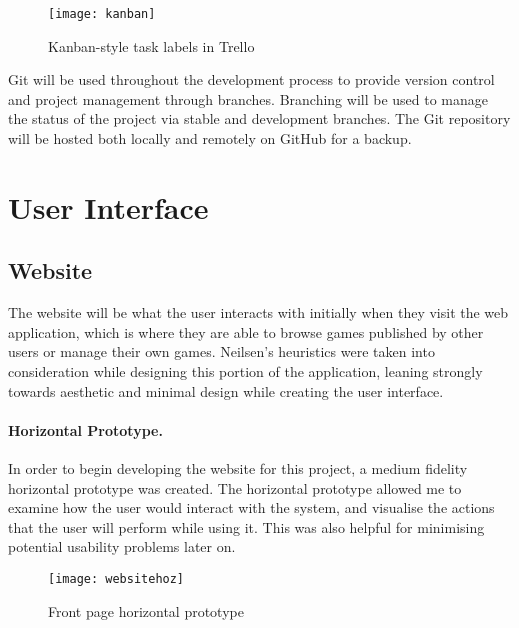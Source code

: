 
\begin{figure}[h]
	\centering
	\texttt{[image: kanban]}
	\caption{Kanban-style task labels in Trello}
	\label{fig:kanban}
\end{figure}


Git will be used throughout the development process to provide version control and project management through branches. Branching will be used to manage the status of the project via stable and development branches. The Git repository will be hosted both locally and remotely on GitHub for a backup.


\section{User Interface}
	\subsection{Website}
	The website will be what the user interacts with initially when they visit the web application, which is where they are able to browse games published by other users or manage their own games. Neilsen's heuristics were taken into consideration while designing this portion of the application, leaning strongly towards aesthetic and minimal design while creating the user interface.


	\paragraph{Horizontal Prototype.}
	In order to begin developing the website for this project, a medium fidelity horizontal prototype was created. The horizontal prototype allowed me to examine how the user would interact with the system, and visualise the actions that the user will perform while using it. This was also helpful for minimising potential usability problems later on.


	\begin{figure}[h]
		\centering
		\texttt{[image: websitehoz]}
		\caption{Front page horizontal prototype}
		\label{fig:frontpageprototype}
	\end{figure}

